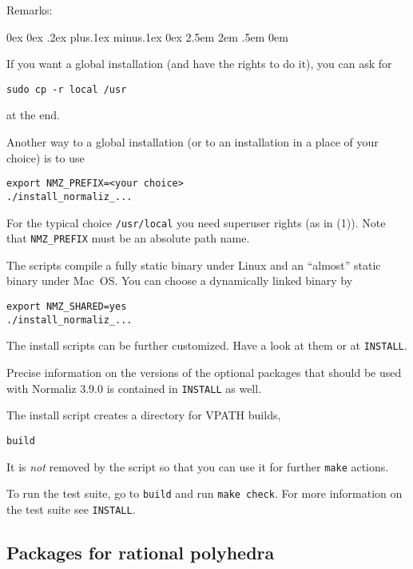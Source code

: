 \documentclass[12pt,a4paper]{scrartcl}
\newcounter{listi}
\newcommand{\stdli}{ \topsep0ex \partopsep0ex %
\parsep.2ex plus.1ex minus.1ex \itemsep0ex%
\leftmargin2.5em \labelwidth2em \labelsep.5em \rightmargin0em}%
\newenvironment{arab}{\begin{list}{\textup{(\arabic{listi})}}%
	{\usecounter{listi}\stdli}}{\end{list}}
\theoremstyle{definition}
\def\ttt{\texttt}
\def\version{3.9.0}
\begin{document}
Remarks:
\begin{arab}

\item If you want a global installation (and have the rights to do it), you can ask for
\begin{Verbatim}
sudo cp -r local /usr
\end{Verbatim}
at the end.

\item Another way to a global installation (or to an installation in a place of your choice) is to use
\begin{Verbatim}
export NMZ_PREFIX=<your choice>  
./install_normaliz_...
\end{Verbatim}

For the typical choice \verb|/usr/local| you need superuser rights (as in (1)). Note that \verb|NMZ_PREFIX| must be an absolute path name.

\item The scripts compile a fully static binary under Linux and an ``almost'' static binary under Mac~OS. You can choose a dynamically linked binary by
\begin{Verbatim}
export NMZ_SHARED=yes
./install_normaliz_...
\end{Verbatim}

\item The install scripts can be further customized. Have a look at them or at \verb|INSTALL|.

\item Precise information on the versions of the optional packages that should be used with Normaliz \version{} is contained in \verb|INSTALL| as well.

\item The install script creates a directory for VPATH builds,
\begin{center}
	\ttt{build}
\end{center}
It is \emph{not} removed by the script so that you can use it for further \ttt{make} actions.

\item To run the test suite, go to \ttt{build} and run \ttt{make check}. For more information on the test suite see \verb|INSTALL|.
\end{arab}

\subsection{Packages for rational polyhedra}
\end{document}
